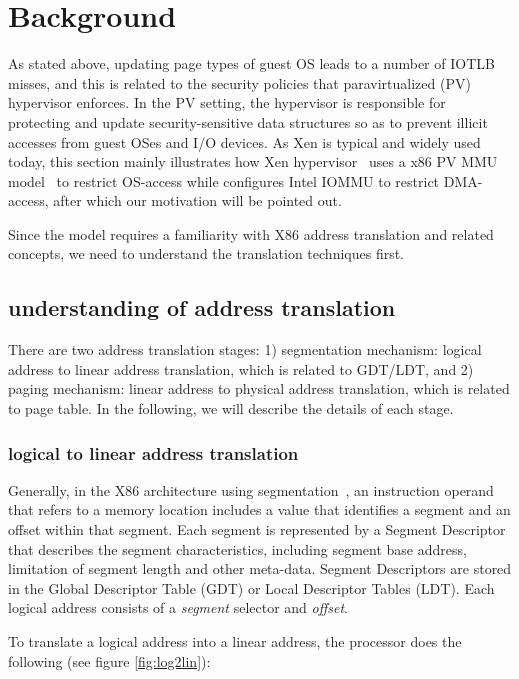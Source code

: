 \section{Background}

As stated above, updating page types of guest OS leads to a number of IOTLB misses, and this is related to the security policies that paravirtualized (PV) hypervisor enforces. In the PV setting, the hypervisor is responsible for protecting and update security-sensitive data structures so as to prevent illicit accesses from guest OSes and I/O devices. As Xen is typical and widely used today, this section mainly illustrates how Xen hypervisor~\cite{XEN-SOPS03} uses a x86 PV MMU model~\cite{x86-pv-model} to restrict OS-access while configures Intel IOMMU to restrict DMA-access, after which our motivation will be pointed out.

Since the model requires a familiarity with X86 address translation and related concepts, we need to understand the translation techniques first.

\subsection{understanding of address translation}

There are two address translation stages: 1) segmentation mechanism: logical address to linear address translation, which is related to GDT/LDT, and 2) paging mechanism: linear address to physical address translation, which is related to page table. In the following, we will describe the details of each stage.

\subsubsection{logical to linear address translation}

Generally, in the X86 architecture using segmentation~\cite{x86}, an instruction operand that refers to a memory location includes a value that identifies a segment and an offset within that segment. Each segment is represented by a Segment Descriptor that describes the segment characteristics, including segment base address, limitation of segment length and other meta-data. Segment Descriptors are stored in the Global Descriptor Table (GDT) or Local Descriptor Tables (LDT). Each logical address consists of a \emph{segment} selector and \emph{offset}.

To translate a logical address into a linear address, the processor does the following (see figure \ref{fig:log2lin}):

